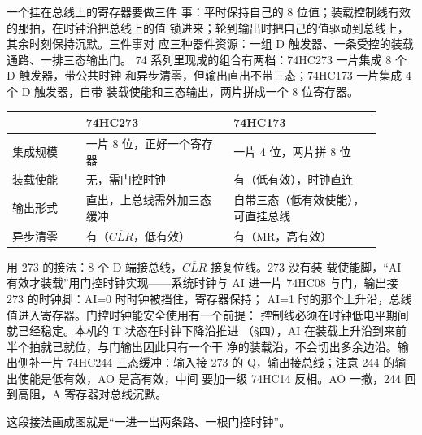 一个挂在总线上的寄存器要做三件
事：平时保持自己的 8 位值；装载控制线有效的那拍，在时钟沿把总线上的值
锁进来；轮到输出时把自己的值驱动到总线上，其余时刻保持沉默。三件事对
应三种器件资源：一组 D 触发器、一条受控的装载通路、一排三态输出门。
74 系列里现成的组合有两档：74HC273 一片集成 8 个 D 触发器，带公共时钟
和异步清零，但输出直出不带三态；74HC173 一片集成 4 个 D 触发器，自带
装载使能和三态输出，两片拼成一个 8 位寄存器。

\begin{longtable}{L{0.18\linewidth}L{0.36\linewidth}L{0.36\linewidth}}
\toprule
 & 74HC273 & 74HC173 \\
\midrule
集成规模 & 一片 8 位，正好一个寄存器 & 一片 4 位，两片拼 8 位 \\
装载使能 & 无，需门控时钟 & 有（低有效），时钟直连 \\
输出形式 & 直出，上总线需外加三态缓冲 & 自带三态（低有效使能），可直挂总线 \\
异步清零 & 有（$\overline{CLR}$，低有效） & 有（MR，高有效） \\
\bottomrule
\end{longtable}

用 273 的接法：8 个 D 端接总线，$\overline{CLR}$ 接复位线。273 没有装
载使能脚，“AI 有效才装载”用门控时钟实现——系统时钟与 AI 进一片
74HC08 与门，输出接 273 的时钟脚：AI=0 时时钟被挡住，寄存器保持；
AI=1 时的那个上升沿，总线值进入寄存器。门控时钟能安全使用有一个前提：
控制线必须在时钟低电平期间就已经稳定。本机的 T 状态在时钟下降沿推进
（§四），AI 在装载上升沿到来前半个拍就已就位，与门输出因此只有一个干
净的装载沿，不会切出多余边沿。输出侧补一片 74HC244 三态缓冲：输入接
273 的 Q，输出接总线；注意 244 的输出使能是低有效，AO 是高有效，中间
要加一级 74HC14 反相。AO 一撤，244 回到高阻，A 寄存器对总线沉默。

这段接法画成图就是“一进一出两条路、一根门控时钟”。

